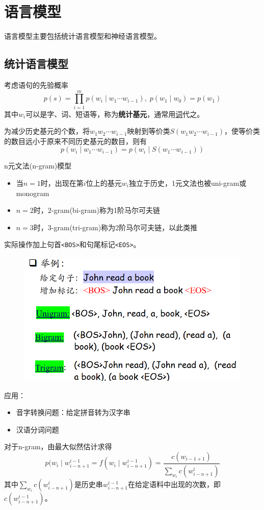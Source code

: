 
\section{语言模型}
语言模型主要包括统计语言模型和神经语言模型。

\subsection{统计语言模型}
考虑语句的先验概率
\[p(s)=\prod_{i=1}^{m}p(w_i\mid w_1\cdots w_{i-1}),\;p(w_1\mid w_0)=p(w_1)\]
其中$w_i$可以是字、词、短语等，称为\textbf{统计基元}，通常用\underline{词}代之。

为减少历史基元的个数，将$w_1w_2\cdots w_{i-1}$映射到等价类$S(w_1w_2\cdots w_{i-1})$，使等价类的数目远小于原来不同历史基元的数目，则有
\[p(w_i\mid w_1\cdots w_{i-1})=p(w_i\mid S(w_1\cdots w_{i-1}))\]

n元文法(n-gram)模型
\begin{itemize}
	\item 当$n=1$时，出现在第$i$位上的基元$w_i$独立于历史，1元文法也被uni-gram或monogram
	\item $n=2$时，2-gram(bi-gram)称为1阶马尔可夫链
	\item $n=3$时，3-gram(tri-gram)称为2阶马尔可夫链，以此类推
\end{itemize}
实际操作加上句首\verb'<BOS>'和句尾标记\verb'<EOS>'。
\begin{figure}[H]
\centering
\includegraphics[width=0.6\linewidth]{fig/n-gram.png}
\end{figure}

应用：
\begin{itemize}
	\item 音字转换问题：给定拼音转为汉字串
	\item 汉语分词问题
\end{itemize}

对于n-gram，由最大似然估计求得
\[p(w_i\mid w_{i-n+1}^{i-1}=f(w_i\mid w_{i-n+1}^{i-1})=\frac{c(w_{i-1+1})}{\sum_{w_i}c(w_{i-n+1}^i)}\]
其中$\sum_{w_i}c(w_{i-n+1}^i)$是历史串$w_{i-n+1}^{i-1}$在给定语料中出现的次数，即$c(w_{i-n+1}^{i-1})$。


